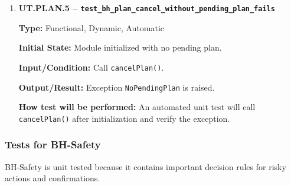 \documentclass[12pt, titlepage]{article}
\begin{document}
\begin{enumerate}
\textbf{Type:} Functional, Dynamic, Automatic

\textbf{Initial State:} Module initialized with a valid mocked plan.

\textbf{Input/Condition:} Call \texttt{executePlan(p)}.

\textbf{Output/Result:} Status becomes Success or Failed based on the mocked
tool result.

\textbf{How test will be performed:} An automated unit test will mock tool
results and check the final status.

\item \textbf{UT.PLAN.5 --
\texttt{test\_bh\_plan\_cancel\_without\_pending\_plan\_fails}}

\textbf{Type:} Functional, Dynamic, Automatic

\textbf{Initial State:} Module initialized with no pending plan.

\textbf{Input/Condition:} Call \texttt{cancelPlan()}.

\textbf{Output/Result:} Exception \texttt{NoPendingPlan} is raised.

\textbf{How test will be performed:} An automated unit test will call
\texttt{cancelPlan()} after initialization and verify the exception.

\end{enumerate}

\subsubsection{Tests for BH-Safety}

BH-Safety is unit tested because it contains important decision rules
for risky actions and confirmations.
\end{document}
